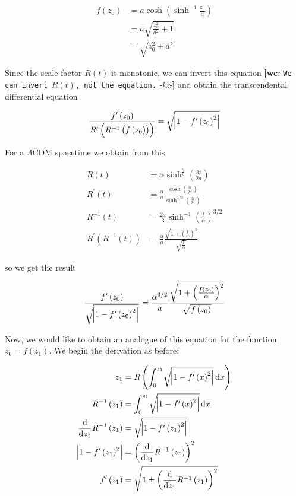 \documentclass[preprint,notitlepage,amsmath,amssymb,floatfix]{revtex4-1}
\newcommand{\XXX}[3]{{\bf [#1: } {\tt #3} {\it -#2-}{\bf ]}}
\begin{document}
\begin{equation}
\begin{split}
f\left(z_0\right) &= a\cosh\left(\sinh^{-1}\frac{z_0}{a}\right) \\
&= a\sqrt{\frac{z_0^2}{a^2}+1} \\
&= \sqrt{z_0^2+a^2}
\end{split}
\end{equation}

\noindent Since the scale factor $R\left(t\right)$ is monotonic, we can invert this equation \XXX{wc}{kz}{We can invert $R(t)$, not the equation.} and obtain the transcendental differential equation

\begin{equation}
\frac{f^\prime\left(z_0\right)}{R^\prime\left(R^{-1}\left(f\left(z_0\right)\right)\right)} = \sqrt{\abs{1 - f^\prime\left(z_0\right)^2}}
\end{equation}

\noindent For a $\Lambda$CDM spacetime we obtain from this

\begin{equation}
\begin{split}
R\left(t\right) &= \alpha\sinh^\frac{2}{3}\left(\frac{3t}{2a}\right) \\
R^\prime\left(t\right) &= \frac{\alpha}{a}\frac{\cosh\left(\frac{3t}{2a}\right)}{\sinh^{1/3}\left(\frac{3t}{2a}\right)} \\
R^{-1}\left(t\right) &= \frac{2a}{3}\sinh^{-1}\left(\frac{t}{\alpha}\right)^{3/2} \\
R^\prime\left(R^{-1}\left(t\right)\right) &= \frac{\alpha}{a}\frac{\sqrt{1+\left(\frac{t}{\alpha}\right)^3}}{\sqrt{\frac{t}{\alpha}}}
\end{split}
\end{equation}

\noindent so we get the result

\begin{equation}
\frac{f^\prime\left(z_0\right)}{\sqrt{\abs{1-f^\prime\left(z_0\right)^2}}} = \frac{\alpha^{3/2}}{a}\frac{\sqrt{1+\left(\frac{f\left(z_0\right)}{\alpha}\right)^2}}{\sqrt{f\left(z_0\right)}}
\end{equation}

Now, we would like to obtain an analogue of this equation for the function $z_0 = f\left(z_1\right)$.  We begin the derivation as before:

\begin{equation}
\begin{split}
z_1 &= R\left(\int_0^{z_1}\!\sqrt{\abs{1-f^\prime\left(x\right)^2}}\,\mathrm dx\right) \\
R^{-1}\left(z_1\right) &= \int_0^{z_1}\!\sqrt{\abs{1-f^\prime\left(x\right)^2}}\,\mathrm dx \\
\frac{\mathrm d}{\mathrm dz_1}R^{-1}\left(z_1\right) &= \sqrt{\abs{1-f^\prime\left(z_1\right)^2}} \\
\abs{1-f^\prime\left(z_1\right)^2} &= \left(\frac{\mathrm d}{\mathrm dz_1}R^{-1}\left(z_1\right)\right)^2 \\
f^\prime\left(z_1\right) &= \sqrt{1\pm\left(\frac{\mathrm d}{\mathrm dz_1}R^{-1}\left(z_1\right)\right)^2}
\end{split}
\end{equation}
\end{document}
